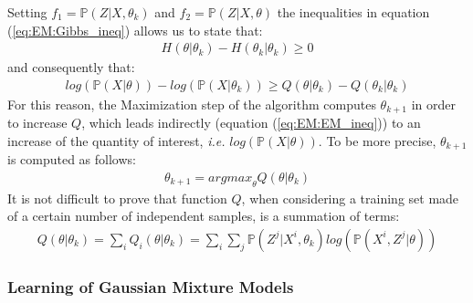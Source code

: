 \documentclass{article}
\begin{document}
Setting $f_1=\mathbb{P}(Z|X,\theta_k)$ and $f_2=\mathbb{P}(Z|X,\theta)$ the inequalities in equation (\ref{eq:EM:Gibbs_ineq}) allows us to state that:
\begin{eqnarray}
H(\theta | \theta_k) - H(\theta_k|\theta_k) \geq 0
\end{eqnarray} 
and consequently that:
\begin{eqnarray}
log(\mathbb{P}(X|\theta)) - log(\mathbb{P}(X|\theta _k)) \geq Q(\theta | \theta_k) - Q(\theta_k | \theta_k)
\label{eq:EM:EM_ineq}
\end{eqnarray}
For this reason, the Maximization step of the algorithm computes $\theta _{k+1}$ in order to increase $Q$, which leads indirectly (equation (\ref{eq:EM:EM_ineq})) to an increase of the quantity of interest, \textit{i.e.} $log(\mathbb{P}(X|\theta))$.
To be more precise, $\theta_{k+1}$ is computed as follows:
\begin{eqnarray}
\theta _ {k+1} = {argmax}_{\theta} Q(\theta | \theta _k)
\end{eqnarray}
It is not difficult to prove that function $Q$, when considering a training set made of a certain number of independent samples, is a summation of terms:
\begin{eqnarray}
Q(\theta | \theta _k) = \sum _i Q_i(\theta | \theta _k) = \sum _i \sum_{j} \mathbb{P}(Z^j|X^i,\theta_k) log(\mathbb{P}(X^i,Z^j|\theta))
\end{eqnarray}

\subsubsection{Learning of Gaussian Mixture Models}
\end{document}

